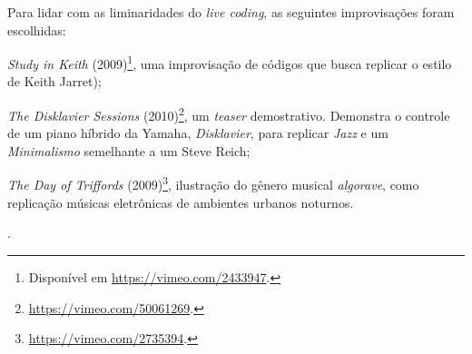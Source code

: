 Para lidar com as liminaridades do \emph{live coding}, as seguintes improvisações foram escolhidas: \begin{inparaenum}
\item \emph{Study in Keith} (2009)\footnote{Disponível em \url{https://vimeo.com/2433947}.}, uma improvisação de códigos que busca replicar o estilo de Keith Jarret);
\item \emph{The Disklavier Sessions} (2010)\footnote{\url{https://vimeo.com/50061269}.}, um \emph{teaser} demostrativo. Demonstra o controle de um piano híbrido da Yamaha, \emph{Disklavier}, para replicar \emph{Jazz} e um \emph{Minimalismo} semelhante a um Steve Reich; 
\item \emph{The Day of Triffords} (2009)\footnote{\url{https://vimeo.com/2735394}.}, ilustração do gênero musical \emph{algorave}, como replicação músicas eletrônicas de ambientes urbanos noturnos.
\end{inparaenum}.

